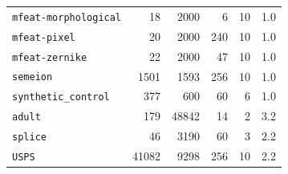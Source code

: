 \begin{longtable}{lrrrrc}
\texttt{mfeat-morphological} & 18 & 2000 & 6 & 10 & 1.0 \\
\texttt{mfeat-pixel} & 20 & 2000 & 240 & 10 & 1.0 \\
\texttt{mfeat-zernike} & 22 & 2000 & 47 & 10 & 1.0 \\
\texttt{semeion} & 1501 & 1593 & 256 & 10 & 1.0 \\
\texttt{synthetic\_control} & 377 & 600 & 60 & 6 & 1.0 \\
\texttt{adult} & 179 & 48842 & 14 & 2 & 3.2 \\
\texttt{splice} & 46 & 3190 & 60 & 3 & 2.2 \\
\texttt{USPS} & 41082 & 9298 & 256 & 10 & 2.2 \\
\end{longtable}
\endgroup
